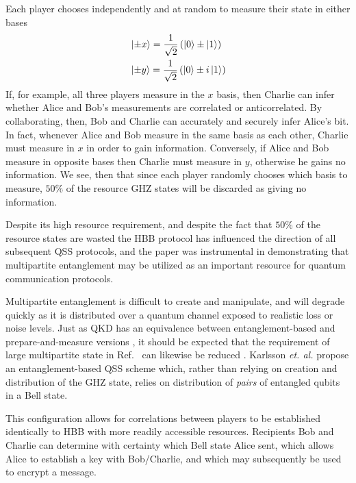 Each player chooses independently and at random to measure their state in either bases
\begin{align}
&\ket{\pm x} = \frac{1}{\sqrt{2}} \left( \ket{0} \pm \ket{1}\right) \notag \\
%
&\ket{\pm y} = \frac{1}{\sqrt{2}} \left( \ket{0} \pm i \ket{1} \right) \notag
\end{align}
If, for example, all three players measure in the $x$ basis, then Charlie can infer whether Alice and Bob's measurements are correlated or anticorrelated. By collaborating, then, Bob and Charlie can accurately and securely infer Alice's bit. In fact, whenever Alice and Bob measure in the same basis as each other, Charlie must measure in $x$ in order to gain information. Conversely, if Alice and Bob measure in opposite bases then Charlie must measure in $y$, otherwise he gains no information. We see, then that since each player randomly chooses which basis to measure, $50\%$ of the resource GHZ states will be discarded as giving no information.

Despite its high resource requirement, and despite the fact that $50\%$ of the resource states are wasted the HBB protocol has influenced the direction of all subsequent QSS protocols, and the paper was instrumental in demonstrating that multipartite entanglement may be utilized as an important resource for quantum communication protocols. 

Multipartite entanglement is difficult to create and manipulate, and will degrade quickly as it is distributed over a quantum channel exposed to realistic loss or noise levels. Just as QKD has an equivalence between entanglement-based and prepare-and-measure versions \cite{Grosshans2003, Laudenbach2017}, it should be expected that the requirement of large multipartite state in Ref.~\cite{Hillery1999} can likewise be reduced \cite{Karlsson1999, Tittel2001, Zhang2005b, Williams2019}. Karlsson \emph{et. al.} \cite{Karlsson1999} propose an entanglement-based QSS scheme which, rather than relying on creation and distribution of the GHZ state, relies on distribution of \emph{pairs} of entangled qubits in a Bell state. 

This configuration allows for correlations between players to be established identically to HBB with more readily accessible resources. Recipients Bob and Charlie can determine with certainty which Bell state Alice sent, which allows Alice to establish a key with Bob/Charlie, and which may subsequently be used to encrypt a message. %

